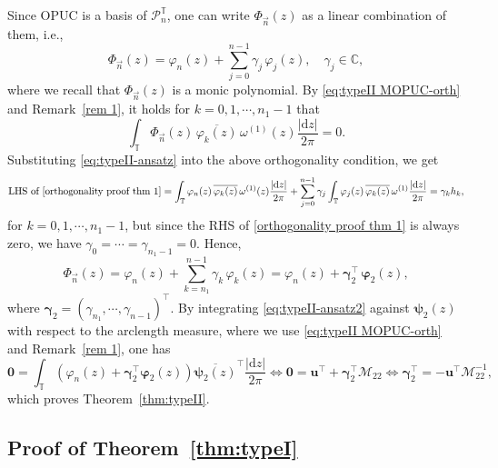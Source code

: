 \documentclass[a4paper,10pt,leqno]{amsart}
\numberwithin{equation}{section}
\theoremstyle{remark}
\newcommand{\dd}{\mathrm{d}}
\newcommand{\C}{\mathbb{C}}
\newcommand{\TT}{\mathbb{T}}
\begin{document}
Since OPUC is a basis of $\mathcal{P}^{\TT}_n$, one can write $\Phi_{\vec{n}}(z)$ as a linear combination of them, i.e.,
\begin{equation}\label{eq:typeII-ansatz}
\Phi_{\vec{n}}(z) = \varphi_n(z) + \sum_{j=0}^{n-1} \gamma_j\,\varphi_j(z), \quad \gamma_j \in \C,
\end{equation}
where we recall that $\Phi_{\vec{n}}(z)$ is a monic polynomial.
By \eqref{eq:typeII MOPUC-orth} and Remark~\ref{rem 1}, it holds for $k=0,1, \cdots, n_1-1$ that
\begin{equation} \label{orthogonality proof thm 1}
\int_{\TT} \Phi_{\vec{n}}(z) \, \overline{\varphi_k(z)} \, \omega^{(1)}(z) \frac{|\dd z|}{2\pi} = 0.
\end{equation}
Substituting \eqref{eq:typeII-ansatz} into the above orthogonality condition, we get
\begin{equation}
\text{LHS of \eqref{orthogonality proof thm 1}} = \int_{\TT} \varphi_n(z) \, \overline{\varphi_k(z)} \, \omega^{(1)}(z) \frac{|\dd z|}{2 \pi} +  \sum_{j=0}^{n-1} \gamma_j \int_{\TT} \varphi_j(z) \, \overline{\varphi_k (z)} \, \omega^{(1)} \frac{|\dd z|}{2\pi} = \gamma_k h_k,
\end{equation}
for $k = 0, 1, \cdots, n_1 - 1$, but since the RHS of \eqref{orthogonality proof thm 1} is always zero, we have
$\gamma_0 = \cdots = \gamma_{n_1-1} = 0$. Hence,
\begin{equation} \label{eq:typeII-ansatz2}
\Phi_{\vec{n}}(z) = \varphi_n(z) + \sum_{k = n_1}^{n-1} \gamma_k \, \varphi_k(z) = \varphi_n (z) + \bm{\gamma}_2^\top \, \bm{\varphi}_2(z),
\end{equation}
where $\bm \gamma_2 = (\gamma_{n_1}, \cdots, \gamma_{n-1})^\top$.
By integrating \eqref{eq:typeII-ansatz2} against $\bm{\psi}_2(z)$ with respect to the arclength measure, where we use \eqref{eq:typeII MOPUC-orth} and Remark~\ref{rem 1}, one has
\[
\bm{0} = \int_{\TT} \left( \varphi_n (z) + \bm \gamma_2^\top  \bm{\varphi}_2(z) \right) \overline{\bm{\psi}_2(z)}^\top \frac{|\dd z|}{2\pi} 
\iff \bm{0} = \bm{u}^\top + \bm{\gamma}_2^\top \bm{\mathcal{M}}_{22}
\iff \bm{\gamma}_2^\top = -\bm{u}^\top \bm{\mathcal{M}}_{22}^{-1},
\]
which proves Theorem~\ref{thm:typeII}.


\subsection{Proof of Theorem~\ref{thm:typeI}} \label{sec: thm 2}
\end{document}
